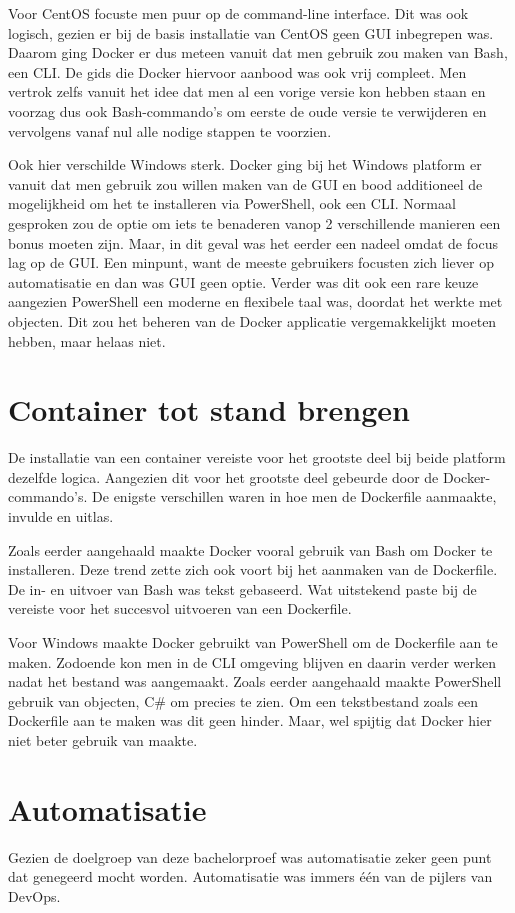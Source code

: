 Voor CentOS focuste men puur op de command-line interface. Dit was ook logisch, gezien er bij de basis installatie van CentOS geen GUI inbegrepen was. Daarom ging Docker er dus meteen vanuit dat men gebruik zou maken van Bash, een CLI. De gids die Docker hiervoor aanbood was ook vrij compleet. Men vertrok zelfs vanuit het idee dat men al een vorige versie kon hebben staan en voorzag dus ook Bash-commando's om eerste de oude versie te verwijderen en vervolgens vanaf nul alle nodige stappen te voorzien.

Ook hier verschilde Windows sterk. Docker ging bij het Windows platform er vanuit dat men gebruik zou willen maken van de GUI en bood additioneel de mogelijkheid om het te installeren via PowerShell, ook een CLI. Normaal gesproken zou de optie om iets te benaderen vanop 2 verschillende manieren een bonus moeten zijn. Maar, in dit geval was het eerder een nadeel omdat de focus lag op de GUI. Een minpunt, want de meeste gebruikers focusten zich liever op automatisatie en dan was GUI geen optie. Verder was dit ook een rare keuze aangezien PowerShell een moderne en flexibele taal was, doordat het werkte met objecten. Dit zou het beheren van de Docker applicatie vergemakkelijkt moeten hebben, maar helaas niet.

\section{Container tot stand brengen}
De installatie van een container vereiste voor het grootste deel bij beide platform dezelfde logica. Aangezien dit voor het grootste deel gebeurde door de Docker-commando's. De enigste verschillen waren in hoe men de Dockerfile aanmaakte, invulde en uitlas.

Zoals eerder aangehaald maakte Docker vooral gebruik van Bash om Docker te installeren. Deze trend zette zich ook voort bij het aanmaken van de Dockerfile. De in- en uitvoer van Bash was tekst gebaseerd. Wat uitstekend paste bij de vereiste voor het succesvol uitvoeren van een Dockerfile.

Voor Windows maakte Docker gebruikt van PowerShell om de Dockerfile aan te maken. Zodoende kon men in de CLI omgeving blijven en daarin verder werken nadat het bestand was aangemaakt. Zoals eerder aangehaald maakte PowerShell gebruik van objecten, C# om precies te zien. Om een tekstbestand zoals een Dockerfile aan te maken was dit geen hinder. Maar, wel spijtig dat Docker hier niet beter gebruik van maakte.

\section{Automatisatie}
Gezien de doelgroep van deze bachelorproef was automatisatie zeker geen punt dat genegeerd mocht worden. Automatisatie was immers één van de pijlers van DevOps.

